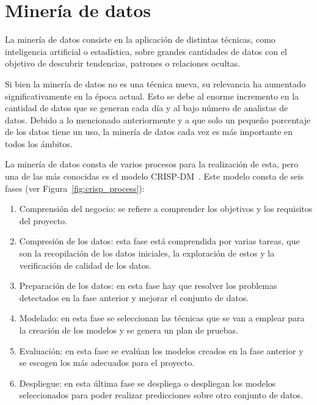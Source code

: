 \setcounter{secnumdepth}{4}


\section{Minería de datos}

La minería de datos \cite{amazon:datamining} consiste en la aplicación de distintas técnicas, como inteligencia artificial o estadística, sobre grandes cantidades de datos con el objetivo de descubrir tendencias, patrones o relaciones ocultas.

\par

Si bien la minería de datos no es una técnica nueva, su relevancia ha aumentado significativamente en la época actual. Esto se debe al enorme incremento en la cantidad de datos que se generan cada día y al bajo número de analistas de datos. Debido a lo mencionado anteriormente y a que solo un pequeño porcentaje de los datos tiene un uso, la minería de datos cada vez es más importante en todos los ámbitos.

\par

La minería de datos consta de varios procesos para la realización de esta, pero una de las más conocidas es el modelo CRISP-DM~\cite{ibm:crisp-dm}. Este modelo consta de seis fases (ver Figura~\ref{fig:crisp_process}):

\begin{enumerate}
    \item Comprensión del negocio: se refiere a comprender los objetivos y los requisitos del proyecto.
    \item Compresión de los datos: esta fase está comprendida por varias tareas, que son la recopilación de los datos iniciales, la exploración de estos y la verificación de calidad de los datos.
    \item Preparación de los datos: en esta fase hay que resolver los problemas detectados en la fase anterior y mejorar el conjunto de datos.
    \item Modelado: en esta fase se seleccionan las técnicas que se van a emplear para la creación de los modelos y se genera un plan de pruebas.
    \item Evaluación: en esta fase se evalúan los modelos creados en la fase anterior y se escogen los más adecuados para el proyecto.
    \item Despliegue: en esta última fase se despliega o despliegan los modelos seleccionados para poder realizar predicciones sobre otro conjunto de datos.
\end{enumerate}

